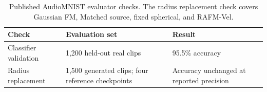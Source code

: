 \begin{table}[t]\centering\small
\begin{tabular}{lll}
\toprule
Check & Evaluation set & Result \\
\midrule
Classifier validation & 1,200 held-out real clips & 95.5\% accuracy \\
Radius replacement & 1,500 generated clips; four reference checkpoints & Accuracy unchanged at reported precision \\
\bottomrule\end{tabular}
\caption{Published AudioMNIST evaluator checks. The radius replacement check covers Gaussian FM, Matched source, fixed spherical, and RAFM-Vel.}
\label{tab:audio-published-controls}\end{table}
